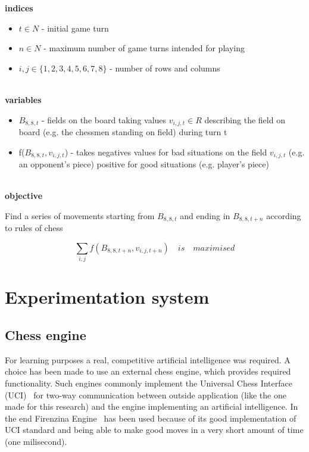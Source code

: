 \documentclass[pdftex]{article}
\begin{document}
\textbf{indices}
\begin{itemize}
 	\item $t \in N$ - initial game turn 
 	\item $n \in N$ - maximum number of game turns intended for playing 
 	\item $i,j \in \{1,2,3,4,5,6,7,8\}$ - number of rows and columns
\end{itemize}
\\
\textbf{variables}
\begin{itemize}
 	\item $B_{8,8,t}$ - fields on the board taking values $v_{i,j,t}\in R$ describing the field on board (e.g. the chessmen standing on field) during turn t
 	\item f($B_{8,8,t},v_{i,j,t}$) - takes negatives values for bad situations on the field $v_{i,j,t}$ (e.g. an opponent's piece) positive for good situations (e.g. player's piece)
\end{itemize}
\\
\textbf{objective}

Find a series of movements starting from $B_{8,8,t}$ and ending in $B_{8,8,t+n}$ according to rules of chess

\begin{equation}
\label{eq:costfunction}
	\sum_{i,j} f(B_{8,8,t+n},v_{i,j,t+n}) \quad is \quad maximised
\end{equation}


\section{Experimentation system}
\label{sec:project}

\subsection{Chess engine}
\label{sec:engine}

For learning purposes a real, competitive artificial intelligence was required. A choice has been made to use an external chess engine, which provides required functionality. Such engines commonly implement the Universal Chess Interface (UCI)~\cite{uci} for two-way communication between outside application (like the one made for this research) and the engine implementing an artificial intelligence. 
In the end Firenzina Engine~\cite{firenzina} has been used because of its good implementation of UCI standard and being able to make good moves in a very short amount of time (one milisecond).
\end{document}
